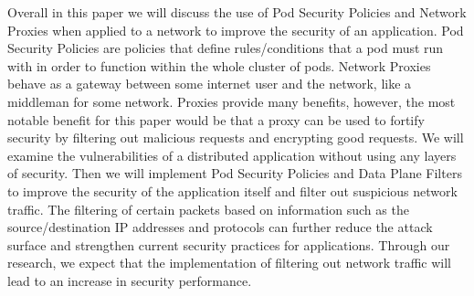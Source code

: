 
Overall in this paper we will discuss the use of Pod Security Policies and Network Proxies 
when applied to a network to improve the security of an application. Pod Security Policies
are policies that define rules/conditions that a pod must run with in order to function within
the whole cluster of pods. Network Proxies behave as a gateway between some internet user and the network,
like a middleman for some network. Proxies provide many benefits, however, the most notable benefit for
this paper would be that a proxy can be used to fortify security by filtering out malicious requests and
encrypting good requests. We will examine the vulnerabilities of a distributed application without using
any layers of security. Then we will implement Pod Security Policies and Data Plane Filters
to improve the security of the application itself and filter out suspicious network traffic.
The filtering of certain packets based on information such as the source/destination
IP addresses and protocols can further reduce the attack surface and strengthen current security practices
for applications. Through our research, we expect that the implementation of filtering
out network traffic will lead to an increase in security performance.